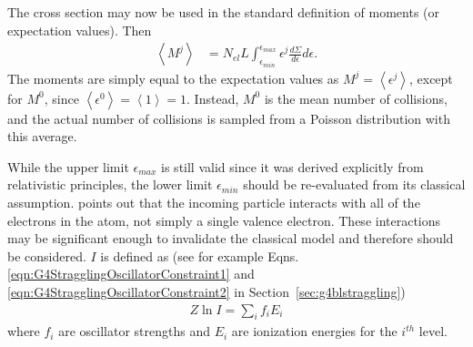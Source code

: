 The cross section may now be used in the standard definition of moments (or expectation values). Then
\begin{align} \label{eqn:StragglingMoments}
\left< M^j\right>&=N_{el} L \int_{\epsilon_{min}} ^{\epsilon_{max}} \epsilon^j \frac{d\Sigma}{d\epsilon} d\epsilon .
\end{align}
The moments are simply equal to the expectation values as $M^j=\left<\epsilon ^j \right>$, except for $M^0$, since $\left< \epsilon ^0 \right>=\left< 1 \right> = 1$. Instead, $M^0$ is the mean number of collisions, and the actual number of collisions is sampled from a Poisson distribution with this average.

While the upper limit $\epsilon_{max}$ is still valid since it was derived explicitly from relativistic principles, the lower limit $\epsilon_{min}$ should be re-evaluated from its classical assumption. \cite{bichsel1968} points out that the incoming particle interacts with all of the electrons in the atom, not simply a single valence electron. These interactions may be significant enough to invalidate the classical model and therefore should be considered. $I$ is defined as (see for example Eqns. \ref{eqn:G4StragglingOscillatorConstraint1} and \ref{eqn:G4StragglingOscillatorConstraint2} in Section~\ref{sec:g4blstraggling})
\begin{gather*}
Z \ln I = \sum_i f_i E_i
\end{gather*}
where $f_i$ are oscillator strengths and $E_i$ are ionization energies for the $i^{th}$ level.
\fi

